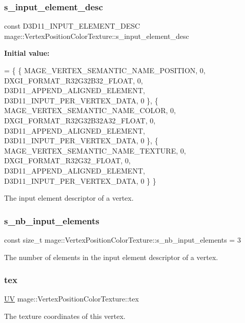 \subsubsection{\texorpdfstring{s\+\_\+input\+\_\+element\+\_\+desc}{s\_input\_element\_desc}}
{\footnotesize\ttfamily const D3\+D11\+\_\+\+I\+N\+P\+U\+T\+\_\+\+E\+L\+E\+M\+E\+N\+T\+\_\+\+D\+E\+SC mage\+::\+Vertex\+Position\+Color\+Texture\+::s\+\_\+input\+\_\+element\+\_\+desc\hspace{0.3cm}{\ttfamily [static]}}

{\bfseries Initial value\+:}
\begin{DoxyCode}
= \{
        \{ MAGE\_VERTEX\_SEMANTIC\_NAME\_POSITION, 0, DXGI\_FORMAT\_R32G32B32\_FLOAT,    0, 
      D3D11\_APPEND\_ALIGNED\_ELEMENT, D3D11\_INPUT\_PER\_VERTEX\_DATA, 0 \},
        \{ MAGE\_VERTEX\_SEMANTIC\_NAME\_COLOR,    0, DXGI\_FORMAT\_R32G32B32A32\_FLOAT, 0, 
      D3D11\_APPEND\_ALIGNED\_ELEMENT, D3D11\_INPUT\_PER\_VERTEX\_DATA, 0 \},
        \{ MAGE\_VERTEX\_SEMANTIC\_NAME\_TEXTURE,  0, DXGI\_FORMAT\_R32G32\_FLOAT,       0, 
      D3D11\_APPEND\_ALIGNED\_ELEMENT, D3D11\_INPUT\_PER\_VERTEX\_DATA, 0 \}
    \}
\end{DoxyCode}
The input element descriptor of a vertex. \hypertarget{structmage_1_1_vertex_position_color_texture_a410ce891e3fd47674af7106ef080ee99}{}\label{structmage_1_1_vertex_position_color_texture_a410ce891e3fd47674af7106ef080ee99} 
\subsubsection{\texorpdfstring{s\+\_\+nb\+\_\+input\+\_\+elements}{s\_nb\_input\_elements}}
{\footnotesize\ttfamily const size\+\_\+t mage\+::\+Vertex\+Position\+Color\+Texture\+::s\+\_\+nb\+\_\+input\+\_\+elements = 3\hspace{0.3cm}{\ttfamily [static]}}

The number of elements in the input element descriptor of a vertex. \hypertarget{structmage_1_1_vertex_position_color_texture_adfbaa105e46bb65f502ec33eaa2e8b15}{}\label{structmage_1_1_vertex_position_color_texture_adfbaa105e46bb65f502ec33eaa2e8b15} 
\subsubsection{\texorpdfstring{tex}{tex}}
{\footnotesize\ttfamily \hyperlink{structmage_1_1_u_v}{UV} mage\+::\+Vertex\+Position\+Color\+Texture\+::tex}

The texture coordinates of this vertex. 